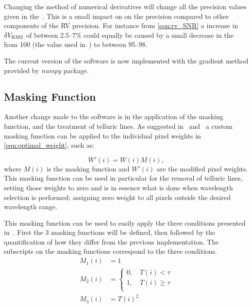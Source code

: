 Changing the method of numerical derivatives will change all the precision values given in the~\citet{figueira_radial_2016}.
This is a small impact on on the precision compared to other components of the {RV} precision.
For instance from \cref{eqn:rv_SNR} a increase in \(\delta V_{\textrm{RMS}}\) of between 2.5--7\%  could equally be caused by a small decrease in the \snr{} from 100 (the value used in~\citet{figueira_radial_2016}) to between 95--98.

The current version of the software is now implemented with the gradient method provided by \emph{numpy} package.

\subsection{Masking Function}
\label{subsec:masking_function}
Another change made to the software is in the application of the masking function, and the treatment of telluric lines.
As suggested in~\citet{connes_absolute_1985} and~\citet{bouchy_fundamental_2001} a custom masking function can be applied to the individual pixel weights in \cref{eqn:optimal_weight}, such as:

\[W'(i) = W(i)M(i),\label{eqn:mask_function}\] where \(M(i)\) is the masking function and \(W'(i)\) are the modified pixel weights.
This masking function can be used in particular for the removal of telluric lines, setting those weights to zero and is in essence what is done when wavelength selection is performed; assigning zero weight to all pixels outside the desired wavelength range.

This masking function can be used to easily apply the three conditions presented in~\citet{figueira_radial_2016}.
First the 3 masking functions will be defined, then followed by the quantification of how they differ from the previous implementation.
The subscripts on the masking functions correspond to the three conditions.
\begin{align}
M_1(i) &= 1 \label{eqn:mask1}\\
M_2(i) &= \begin{cases}
0, \hspace{1em} T(i) < \tau\\
1, \hspace{1em} T(i) \ge \tau\\
\end{cases}\label{eqn:mask2}\\
M_3(i) &= {T(i)}^{2} \label{eqn:mask3}
\end{align}

